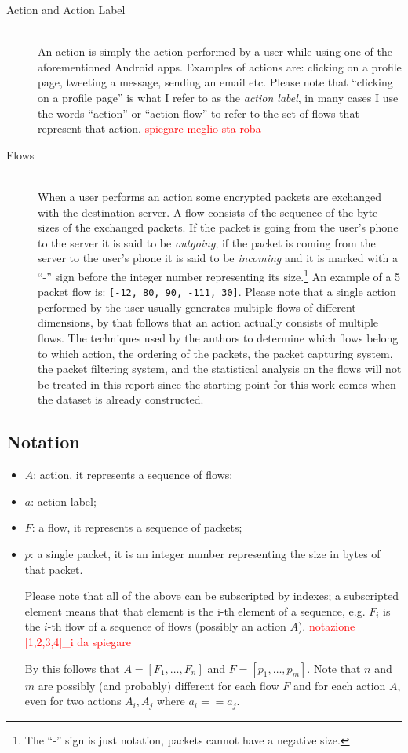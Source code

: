 \documentclass[a4paper,10pt]{scrartcl}
\newcommand\todo[1]{\textcolor{red}{#1}}
\begin{document}
\begin{description}
  \item[Action and Action Label] \hfill \\ An action is simply the action performed by a user while using one of the aforementioned Android apps. Examples of actions are: clicking on a profile page, tweeting a message, sending an email etc. Please note that ``clicking on a profile page'' is what I refer to as the \textit{action label}, in many cases I use the words ``action'' or ``action flow'' to refer to the set of flows that represent that action. \todo{spiegare meglio sta roba}
  \item[Flows] \hfill \\ When a user performs an action some encrypted packets are exchanged with the destination server. A flow consists of the sequence of the byte sizes of the exchanged packets. If the packet is going from the user's phone to the server it is said to be \textit{outgoing}; if the packet is coming from the server to the user's phone it is said to be \textit{incoming} and it is marked with a ``-'' sign before the integer number representing its size.\footnote{The ``-'' sign is just notation, packets cannot have a negative size.} An example of a 5 packet flow is: \texttt{[-12, 80, 90, -111, 30]}. Please note that a single action performed by the user usually generates multiple flows of different dimensions, by that follows that an action actually consists of multiple flows. The techniques used by the authors to determine which flows belong to which action, the ordering of the packets, the packet capturing system, the packet filtering system, and the statistical analysis on the flows will not be treated in this report since the starting point for this work comes when the dataset is already constructed.
\end{description}

\subsection{Notation}
\label{subsec:notation}
\begin{itemize}
 \item $ A $: action, it represents a sequence of flows;
 \item $ a $: action label;
 \item $ F $: a flow, it represents a sequence of packets;
 \item $ p $: a single packet, it is an integer number representing the size in bytes of that packet.
 
 Please note that all of the above can be subscripted by indexes; a subscripted element means that that element is the i-th element of a sequence, e.g. $F_i$ is the $i$-th flow of a sequence of flows (possibly an action $A$). \todo{notazione [1,2,3,4]\_i da spiegare}
 
 By this follows that $A = [F_1, \dots, F_n]$ and $F = [p_1,\dots, p_m]$. Note that $n$ and $m$ are possibly (and probably) different for each flow $F$ and for each action $A$, even for two actions $A_i, A_j$ where $a_i == a_j$.
\end{itemize}
\end{document}
